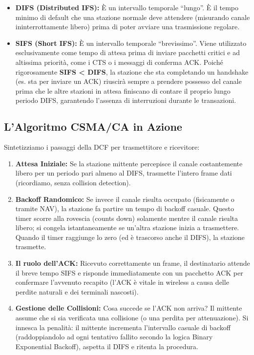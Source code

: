 \documentclass[
  italian,
  openany]{book}
\begin{document}
\begin{itemize}
\item
  \textbf{DIFS (Distributed IFS):} È un intervallo temporale ``lungo''.
  È il tempo minimo di default che una stazione normale deve attendere
  (misurando canale ininterrottamente libero) prima di poter avviare una
  trasmissione regolare.
\item
  \textbf{SIFS (Short IFS):} È un intervallo temporale ``brevissimo''.
  Viene utilizzato esclusivamente come tempo di attesa prima di inviare
  pacchetti critici e ad altissima priorità, come i CTS o i messaggi di
  conferma ACK. Poiché rigorosamente \textbf{SIFS \textless{} DIFS}, la
  stazione che sta completando un handshake (es. sta per inviare un ACK)
  riuscirà sempre a prendere possesso del canale prima che le altre
  stazioni in attesa finiscano di contare il proprio lungo periodo DIFS,
  garantendo l'assenza di interruzioni durante le transazioni.
\end{itemize}

\subsection{L'Algoritmo CSMA/CA in
Azione}\label{lalgoritmo-csmaca-in-azione}

Sintetizziamo i passaggi della DCF per trasmettitore e ricevitore:

\begin{enumerate}
\def\labelenumi{\arabic{enumi}.}
\item
  \textbf{Attesa Iniziale:} Se la stazione mittente percepisce il canale
  costantemente libero per un periodo pari almeno al DIFS, trasmette
  l'intero frame dati (ricordiamo, senza collision detection).
\item
  \textbf{Backoff Randomico:} Se invece il canale risulta occupato
  (fisicamente o tramite NAV), la stazione fa partire un tempo di
  backoff casuale. Questo timer scorre alla rovescia (counts down)
  solamente mentre il canale risulta libero; si congela istantaneamente
  se un'altra stazione inizia a trasmettere. Quando il timer raggiunge
  lo zero (ed è trascorso anche il DIFS), la stazione trasmette.
\item
  \textbf{Il ruolo dell'ACK:} Ricevuto correttamente un frame, il
  destinatario attende il breve tempo SIFS e risponde immediatamente con
  un pacchetto ACK per confermare l'avvenuto recapito (l'ACK è vitale in
  wireless a causa delle perdite naturali e dei terminali nascosti).
\item
  \textbf{Gestione delle Collisioni:} Cosa succede se l'ACK non arriva?
  Il mittente assume che si sia verificata una collisione (o una perdita
  per attenuazione). Si innesca la penalità: il mittente incrementa
  l'intervallo casuale di backoff (raddoppiandolo ad ogni tentativo
  fallito secondo la logica Binary Exponential Backoff), aspetta il DIFS
  e ritenta la procedura.
\end{enumerate}
\end{document}
